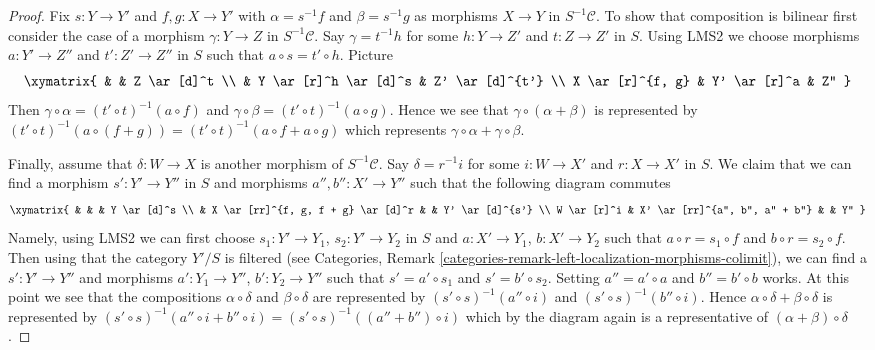 \begin{proof}
\medskip\noindent
Fix $s : Y \to Y'$ and $f, g : X \to Y'$ with
$\alpha = s^{-1}f$ and $\beta = s^{-1}g$ as morphisms $X \to Y$
in $S^{-1}\mathcal{C}$.
To show that composition is bilinear first consider the case of a
morphism $\gamma : Y \to Z$ in $S^{-1}\mathcal{C}$. Say $\gamma = t^{-1}h$
for some $h : Y \to Z'$ and $t : Z \to Z'$ in $S$. Using LMS2 we
choose morphisms $a : Y' \to Z''$ and $t' : Z' \to Z''$ in $S$ such
that $a \circ s = t' \circ h$. Picture
$$
\xymatrix{
& & Z \ar[d]^t \\
& Y \ar[r]^h \ar[d]^s & Z' \ar[d]^{t'} \\
X \ar[r]^{f, g} & Y' \ar[r]^a & Z''
}
$$
Then
$\gamma \circ \alpha = (t' \circ t)^{-1}(a \circ f)$ and
$\gamma \circ \beta = (t' \circ t)^{-1}(a \circ g)$.
Hence we see that $\gamma \circ (\alpha + \beta)$ is represented
by $(t' \circ t)^{-1}(a \circ (f + g)) =
(t' \circ t)^{-1}(a \circ f + a \circ g)$ which represents
$\gamma \circ \alpha + \gamma \circ \beta$.

\medskip\noindent
Finally, assume that $\delta : W \to X$ is another morphism of
$S^{-1}\mathcal{C}$. Say $\delta = r^{-1}i$ for some
$i : W \to X'$ and $r : X \to X'$ in $S$. We claim that we can find
a morphism $s' : Y' \to Y''$ in $S$ and morphisms $a'', b'' : X' \to Y''$
such that the following diagram commutes
$$
\xymatrix{
& & & Y \ar[d]^s \\
& X \ar[rr]^{f, g, f + g} \ar[d]^r & & Y' \ar[d]^{s'} \\
W \ar[r]^i & X' \ar[rr]^{a'', b'', a'' + b''} & & Y''
}
$$
Namely, using LMS2 we can first choose
$s_1 : Y' \to Y_1$, $s_2 : Y' \to Y_2$ in $S$ and
$a : X' \to Y_1$, $b : X' \to Y_2$ such that
$a \circ r = s_1 \circ f$ and $b \circ r = s_2 \circ f$.
Then using that the category $Y'/S$ is filtered (see
Categories, Remark \ref{categories-remark-left-localization-morphisms-colimit}),
we can
find a $s' : Y' \to Y''$ and morphisms $a' : Y_1 \to Y''$, $b' : Y_2 \to Y''$
such that $s' = a' \circ s_1$ and $s' = b' \circ s_2$. Setting
$a'' = a' \circ a$ and $b'' = b' \circ b$ works.
At this point we see that the compositions
$\alpha \circ \delta$ and $\beta \circ \delta$ are represented by
$(s' \circ s)^{-1}(a'' \circ i)$ and $(s' \circ s)^{-1}(b'' \circ i)$.
Hence $\alpha \circ \delta + \beta \circ \delta$ is represented
by $(s' \circ s)^{-1}(a'' \circ i + b'' \circ i) =
(s' \circ s)^{-1}((a'' + b'') \circ i)$
which by the diagram again is a representative
of $(\alpha + \beta) \circ \delta$.
\end{proof}

